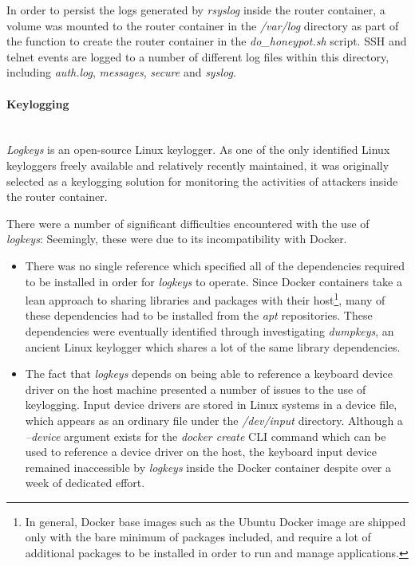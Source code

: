  In order to persist the logs generated by \textit{rsyslog} inside the router container, a volume was mounted to the router container in the \textit{/var/log} directory as part of the function to create the router container in the  \textit{do\_honeypot.sh} script. SSH and telnet events are logged to a number of different log files within this directory, including \textit{auth.log}, \textit{messages}, \textit{secure} and \textit{syslog}.
    

	  \paragraph{Keylogging}\mbox{}\\
      \textit{Logkeys} is an open-source Linux keylogger. \cite{LogkeysGithub} As one of the only identified Linux keyloggers freely available and relatively recently maintained, it was originally selected as a keylogging solution for monitoring the activities of attackers inside the router container.
      
      There were a number of significant difficulties encountered with the use of \textit{logkeys}: Seemingly, these were due to its incompatibility with Docker.
      \begin{itemize}
      \item There was no single reference which specified all of the dependencies required to be installed in order for \textit{logkeys} to operate. Since Docker containers take a lean approach to sharing libraries and packages with their host\footnote{In general, Docker base images such as the Ubuntu Docker image are shipped only with the bare minimum of packages included, and require a lot of additional packages to be installed in order to run and manage applications.}, many of these dependencies had to be installed from the \textit{apt} repositories. These dependencies were eventually identified through investigating \textit{dumpkeys}, an ancient Linux keylogger which shares a lot of the same library dependencies. \cite{dumpkeysKeyloggerManpage}
      \item The fact that \textit{logkeys} depends on being able to reference a keyboard device driver on the host machine presented a number of issues to the use of keylogging. Input device drivers are stored in Linux systems in a device file, which appears as an ordinary file under the \textit{/dev/input} directory. Although a \textit{--device} argument exists for the \textit{docker create} CLI command which can be used to reference a device driver on the host, the keyboard input device remained inaccessible by \textit{logkeys} inside the Docker container despite over a week of dedicated effort.
      \end{itemize}
 
